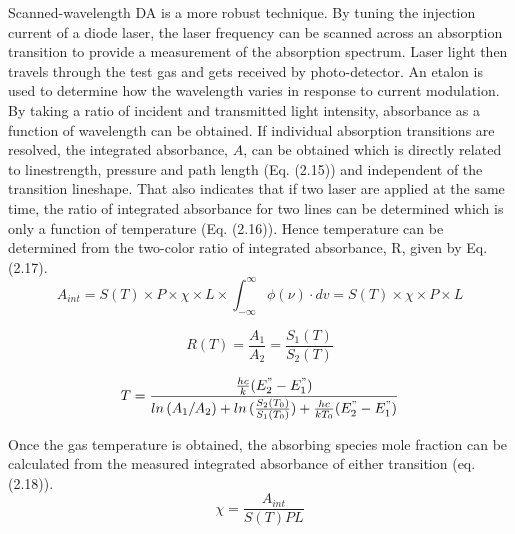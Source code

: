 Scanned-wavelength DA is a more robust technique. By tuning the injection current of a diode laser, the laser frequency can be scanned across an absorption transition to provide a measurement of the absorption spectrum. Laser light then travels through the test gas and gets received by photo-detector. An etalon is used to determine how the wavelength varies in response to current modulation. By taking a ratio of incident and transmitted light intensity, absorbance as a function of wavelength can be obtained. If individual absorption transitions are resolved, the integrated absorbance, $A$, can be obtained which is directly related to linestrength, pressure and path length (Eq. (2.15)) and independent of the transition lineshape. That also indicates that if two laser are applied at the same time, the ratio of integrated absorbance for two lines can be determined which is only a function of temperature (Eq. (2.16)). Hence temperature can be determined from the two-color ratio of integrated absorbance, R, given by Eq. (2.17).
\begin{equation}\label{}
A_{int}=S(T)\times P \times \chi \times L \times \int_{-\infty}^{\infty}\phi(\nu) \cdot dv=S(T) \times \chi \times P \times L
\end{equation}

\vspace{-2mm}

\begin{equation}\label{}
R(T)=\frac{A_1}{A_2}=\frac{S_1(T)}{S_2(T)}
\end{equation}

\vspace{-2mm}

\begin{equation}\label{}
T=\frac{\frac{hc}{k}(E_2^"-E_1^")}{ln\,(A_1/A_2)+ln\,(\frac{S_2(T_0)}{S_1(T_0)})+\frac{hc}{kT_0}(E_2^"-E_1^")}
\end{equation}

\vspace{5mm}

Once the gas temperature is obtained, the absorbing species mole fraction can be calculated from the measured integrated absorbance of either transition (eq. (2.18)).
\begin{equation}\label{}
\chi=\frac{A_{int}}{S(T)PL}
\end{equation}

